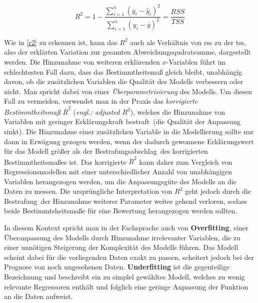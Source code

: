 \begin{equation}
R^2 = 1 - \frac{\sum\limits_{i=1}^n (y_i - \hat{y}_i)^2}{\sum\limits_{i=1}^n (y_i - \overline{y})^2}= \frac{RSS}{TSS}
\label{r2}
\end{equation}

Wie in \vref{r2} zu erkennen ist, kann das $R^2$ auch als Verhältnis von \gls{rss} zu der \gls{tss}, also der erklärten Variation zur gesamten Abweichungsqudratsumme, dargestellt werden. Die Hinzunahme von weiteren erklärenden $x$-Variablen führt im schlechtesten Fall dazu, dass das Bestimmtheitsmaß gleich bleibt, unabhängig davon, ob die zusätzlichen Variablen die Qualität des Modells verbessern oder nicht. Man spricht dabei von einer \textit{Überparametrisierung} des Modells. Um diesen Fall zu vermeiden, verwendet man in der Praxis das \textit{korrigierte Bestimmtheitsmaß} $\overline{R}^2$ (\textit{engl.: adjusted $R^2$}), welches die Hinzunahme von Variablen mit geringer Erklärungskraft \glqq bestraft\grqq~(die Qualität der Anpassung sinkt). Die Hinzunahme einer zusätzlichen Variable in die Modellierung sollte nur dann in Erwägung gezogen werden, wenn der dadurch gewonnene Erklärungswert für das Modell größer als der \glqq Bestrafungsabschlag\grqq~des korrigierten Bestimmtheitsmaßes ist. Das korrigierte $\overline{R}^2$ kann daher zum Vergleich von Regressionsmodellen mit einer unterschiedlicher Anzahl von unabhängigen Variablen herangezogen werden, um die Anpassungsgüte des Modells an die Daten zu messen. Die ursprüngliche Interpretation von $R^2$ geht jedoch durch die \glqq Bestrafung\grqq~der Hinzunahme weiterer Parameter weites gehend verloren, sodass beide Bestimmtsheitsmaße für eine Bewertung herangezogen werden sollten. 

In diesem Kontext spricht man in der Fachsprache auch von \textbf{Overfitting}, einer Überanpassung des Modells durch Hinzunahme irrelevanter Variablen, die zu einer unnötigen Steigerung der Komplexität des Modells führen. Das Modell scheint dabei für die vorliegenden Daten exakt zu passen, scheitert jedoch bei der Prognose von noch ungesehenen Daten. \textbf{Underfitting} ist die gegenteilige Bezeichnung und beschreibt ein zu simplel gewähltes Modell, welches zu wenig relevante Regressoren enthält und folglich eine geringe Anpassung der Funktion an die Daten aufweist. 


